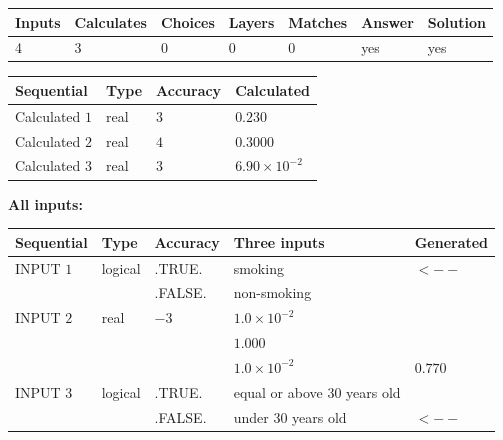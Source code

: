 \documentclass[12pt]{article}
\begin{document}
 

 
\vspace{0.3in}
   
   
   
   
\noindent\begin{tabular}{|l|l|l|l|l|l|l|}
 \hline
Inputs & Calculates & Choices & Layers & Matches & Answer & Solution \\ \hline
           4  & 
           3  & 
           0
  & 
           0  & 
           0  & 
  yes & 
  yes 
  \\ \hline
 \end{tabular}
   
   
   
   
\noindent{}
   
   
  
  
\noindent\begin{tabular}{|l|l|l|l|}
\hline
 Sequential & Type & Accuracy & Calculated \\ 
\hline
 
 
  Calculated $            1 $ & real & $            3  $ & 
 $ 0.230 $ 
 \\  \hline  
 
 
  Calculated $            2 $ & real & $            4  $ & 
 $ 0.3000 $ 
 \\  \hline  
 
 
  Calculated $            3 $ & real & $            3  $ & 
 $ 6.90 \times 10^{-2} $ 
 \\  \hline  
 \end{tabular}
   
   
   
   
\noindent\vspace{0.1in}\hspace{-0.08in} {\textbf{\Large{All inputs: }}}
   
   
  
  
\noindent\begin{tabular}{|l|l|l|l|l|}
\hline
 Sequential & Type & Accuracy & Three inputs & Generated \\ 
\hline
 
 
  INPUT $            1 $ & logical & .TRUE. & 
 smoking & 
  $ <-- $ 
  \\
  & & .FALSE. & 
  non-smoking & 
 \\  \hline  
 
 
  INPUT $            2 $ & real & $           -3  $ & $
 1.0 \times 10^{-2}
  $ & \\
  & & &  $
 1.000
  $ & \\
  & & &  $
 1.0 \times 10^{-2}
 $ & $ 0.770 $ 
 \\  \hline  
 
 
  INPUT $            3 $ & logical & .TRUE. & 
 equal or above 30 years old & 
  \\
  & & .FALSE. & 
  under 30 years old & 
  $ <-- $ 
 \\  \hline  
 \end{tabular}
   
\end{document}
